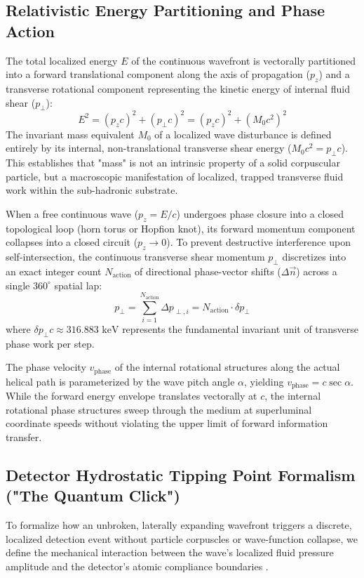 \documentclass[11pt,a4paper]{article}
\begin{document}
	\subsection{Relativistic Energy Partitioning and Phase Action}
	The total localized energy $E$ of the continuous wavefront is vectorally partitioned into a forward translational component along the axis of propagation ($p_z$) and a transverse rotational component representing the kinetic energy of internal fluid shear ($p_\perp$):
	\begin{equation}
		E^2 = (p_z c)^2 + (p_\perp c)^2 = (p_z c)^2 + (M_0 c^2)^2
	\end{equation}
	The invariant mass equivalent $M_0$ of a localized wave disturbance is defined entirely by its internal, non-translational transverse shear energy ($M_0 c^2 = p_\perp c$). This establishes that "mass" is not an intrinsic property of a solid corpuscular particle, but a macroscopic manifestation of localized, trapped transverse fluid work within the sub-hadronic substrate.
	
	When a free continuous wave ($p_z = E/c$) undergoes phase closure into a closed topological loop (horn torus or Hopfion knot), its forward momentum component collapses into a closed circuit ($p_z \to 0$). To prevent destructive interference upon self-intersection, the continuous transverse shear momentum $p_\perp$ discretizes into an exact integer count $N_{\text{action}}$ of directional phase-vector shifts ($\Delta\vec{n}$) across a single $360^\circ$ spatial lap:
	\begin{equation}
		p_\perp = \sum_{i=1}^{N_{\text{action}}} \Delta p_{\perp, i} = N_{\text{action}} \cdot \delta p_\perp
	\end{equation}
	where $\delta p_\perp c \approx 316.883\text{ keV}$ represents the fundamental invariant unit of transverse phase work per step.
	
	The phase velocity $v_{\text{phase}}$ of the internal rotational structures along the actual helical path is parameterized by the wave pitch angle $\alpha$, yielding $v_{\text{phase}} = c \sec \alpha$. While the forward energy envelope translates vectorally at $c$, the internal rotational phase structures sweep through the medium at superluminal coordinate speeds without violating the upper limit of forward information transfer.
	
	\subsection{Detector Hydrostatic Tipping Point Formalism ("The Quantum Click")}
	To formalize how an unbroken, laterally expanding wavefront triggers a discrete, localized detection event without particle corpuscles or wave-function collapse, we define the mechanical interaction between the wave's localized fluid pressure amplitude and the detector's atomic compliance boundaries \cite{kulangiev2025}.
	
\end{document}
